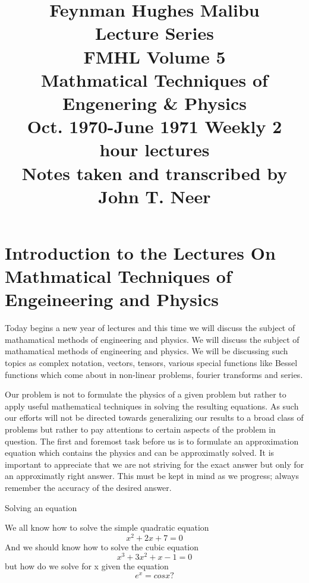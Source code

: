 \documentclass[a4paper,10pt]{article}
\begin{document}
\begin{titlepage} 

\title{{\LARGE \textbf{Feynman Hughes Malibu\\ Lecture Series}} \\
FMHL Volume 5\\
\textbf{Mathmatical Techniques of \\ Engenering \& Physics}\\
Oct. 1970-June 1971
Weekly 2 hour lectures\\
Notes taken and transcribed by \\ John T. Neer}
\author{}
\date{}

\maketitle

\end{titlepage}

\renewcommand\contentsname{Lecture}
\tableofcontents
\pagebreak

\section{Introduction to the Lectures On Mathmatical Techniques of Engeineering and Physics}

Today begins a new year of lectures and this time we will discuss the subject of mathamatical methods of engineering and physics.
We will discuss the subject of mathamatical methods of engineering and physics.  We will be discussing such topics as complex
 notation, vectors, tensors, various special functions like Bessel functions which come about in non-linear problems, fourier transforms
and series. 

Our problem is not to formulate the physics of a given problem but rather to apply useful mathematical techniques in solving
the resulting equations.  As such our efforts will not be directed towards generalizing our results to a broad class of problems
but rather to pay attentions to certain aspects of the problem in question. The first and foremost task before us is to formulate
an approximation equation which contains the physics and can be approximatly solved. It is important to appreciate that we are 
not striving for the exact answer but only for an approximatly right answer.  This must be kept in mind as we progress; always 
remember the accuracy of the desired answer.

\begin{center}
 Solving an equation

We all know how to solve the simple quadratic equation
$$ x^2+2x+7=0$$
And we should know how to solve the cubic equation
$$x^3+3x^2+x-1=0$$
but how do we solve for x given the equation
$$e^x=cosx?$$
\end{center}
\end{document}
